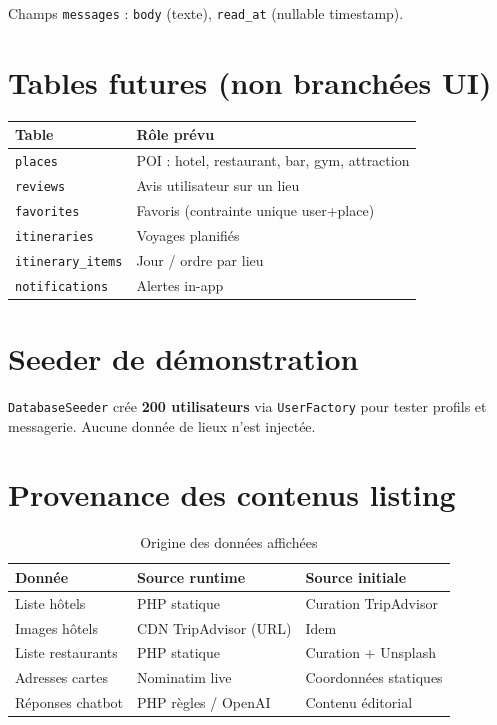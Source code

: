 Champs \texttt{messages} : \texttt{body} (texte), \texttt{read\_at} (nullable timestamp).

\section{Tables futures (non branchées UI)}

\begin{longtable}{@{}lp{9cm}@{}}
\toprule
\textbf{Table} & \textbf{Rôle prévu} \\
\midrule
\texttt{places} & POI : hotel, restaurant, bar, gym, attraction \\
\texttt{reviews} & Avis utilisateur sur un lieu \\
\texttt{favorites} & Favoris (contrainte unique user+place) \\
\texttt{itineraries} & Voyages planifiés \\
\texttt{itinerary\_items} & Jour / ordre par lieu \\
\texttt{notifications} & Alertes in-app \\
\bottomrule
\end{longtable}

\section{Seeder de démonstration}

\texttt{DatabaseSeeder} crée \textbf{200 utilisateurs} via \texttt{UserFactory} pour tester profils et messagerie. Aucune donnée de lieux n'est injectée.

\section{Provenance des contenus listing}

\begin{table}[H]
\centering
\caption{Origine des données affichées}
\begin{tabular}{@{}lll@{}}
\toprule
\textbf{Donnée} & \textbf{Source runtime} & \textbf{Source initiale} \\
\midrule
Liste hôtels & PHP statique & Curation TripAdvisor \\
Images hôtels & CDN TripAdvisor (URL) & Idem \\
Liste restaurants & PHP statique & Curation + Unsplash \\
Adresses cartes & Nominatim live & Coordonnées statiques \\
Réponses chatbot & PHP règles / OpenAI & Contenu éditorial \\
\bottomrule
\end{tabular}
\end{table}
